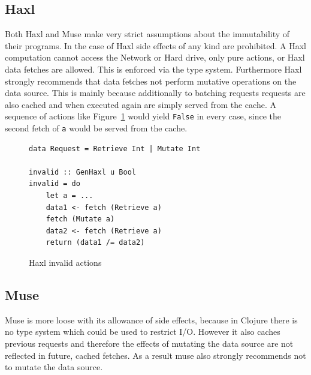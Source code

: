 \subsection{Haxl}

Both Haxl and Muse make very strict assumptions about the immutability of their programs.
In the case of Haxl side effects of any kind are prohibited.
A Haxl computation cannot access the Network or Hard drive, only pure actions, or Haxl data fetches are allowed.
This is enforced via the type system.
Furthermore Haxl strongly recommends that data fetches not perform mutative operations on the data source.
This is mainly because additionally to batching requests requests are also cached and when executed again are simply served from the cache.
A sequence of actions like Figure~\ref{fig:haxl-invalid-actions} would yield \texttt{False} in every case, since the second fetch of \texttt{a} would be served from the cache.

\begin{figure}
\begin{verbatim}
data Request = Retrieve Int | Mutate Int

invalid :: GenHaxl u Bool
invalid = do
    let a = ...
    data1 <- fetch (Retrieve a)
    fetch (Mutate a)
    data2 <- fetch (Retrieve a)
    return (data1 /= data2)
\end{verbatim}
\caption{Haxl invalid actions}
\label{fig:haxl-invalid-actions}
\end{figure}

\subsection{Muse}

Muse is more loose with its allowance of side effects, because in Clojure there is no type system which could be used to restrict I/O.
However it also caches previous requests and therefore the effects of mutating the data source are not reflected in future, cached fetches.
As a result muse also strongly recommends not to mutate the data source.
